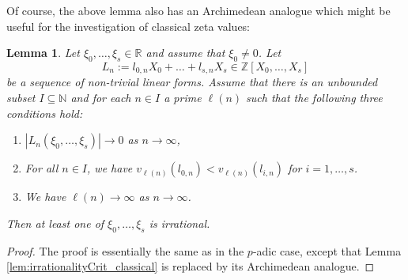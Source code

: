 \documentclass[12pt]{article}
\newtheorem{lemma}[theorem]{Lemma}
\numberwithin{equation}{section}
\begin{document}
Of course, the above lemma also has an Archimedean analogue which might be useful for the investigation of classical zeta values:
\begin{lemma}\label{lem:irrationalityCrit_R}
Let $\xi_0,\dots,\xi_s\in \mathbb{R}$ and assume that $\xi_0\neq 0$. Let 
\[
	L_n:=l_{0,n}X_0+\dots + l_{s,n}X_s\in \mathbb{Z}[X_0,\dots, X_s] 
\]
be a sequence of non-trivial linear forms. Assume that there is an unbounded subset $I\subseteq\mathbb{N}$ and for each $n\in I$ a prime $\ell(n)$ such that the following three conditions hold:
\begin{enumerate}
\item\label{lem:irrationalityCrit_R:i} $|L_n(\xi_0,\dots,\xi_s)|\rightarrow 0$ as $n\to \infty$,
\item\label{lem:irrationalityCrit_R:ii} For all $n\in I$, we have $v_{\ell(n)}(l_{0,n})<v_{\ell(n)}(l_{i,n})$ for $i=1,\dots,s$.
\item\label{lem:irrationalityCrit_R:iii} We have $\ell(n)\to \infty $ as $n\to \infty$.
\end{enumerate}
Then at least one of $\xi_0,\dots,\xi_s$ is irrational. 
\end{lemma}
\begin{proof}
    The proof is essentially the same as in the $p$-adic case, except that Lemma \ref{lem:irrationalityCrit_classical} is replaced by its Archimedean analogue.
\end{proof}
\end{document}
